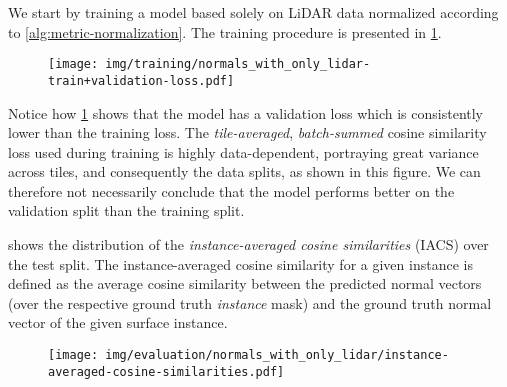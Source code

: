 We start by training a model based solely on LiDAR data normalized according to \cref{alg:metric-normalization}.
The training procedure is presented in \cref{fig:lidar-training}.
%
\begin{figure}[H]
  \texttt{[image: img/training/normals\_with\_only\_lidar-train+validation-loss.pdf]}
  \label{fig:lidar-training}
\end{figure}
\noindent
Notice how \cref{fig:lidar-training} shows that the model has a validation loss which is consistently lower than the training loss.
The \textit{tile-averaged}, \textit{batch-summed} cosine similarity loss used during training is highly data-dependent, portraying great variance across tiles, and consequently the data splits, as shown in this figure.
We can therefore not necessarily conclude that the model performs better on the validation split than the training split.

 shows the distribution of the \textit{instance-averaged cosine similarities} (IACS) over the test split.
The instance-averaged cosine similarity for a given instance is defined as the average cosine similarity between the predicted normal vectors (over the respective ground truth \emph{instance} mask) and the ground truth normal vector of the given surface instance.

\begin{figure}
  \texttt{[image: img/evaluation/normals\_with\_only\_lidar/instance-averaged-cosine-similarities.pdf]}
  \label{fig:lidar-test-distribution}
\end{figure}

